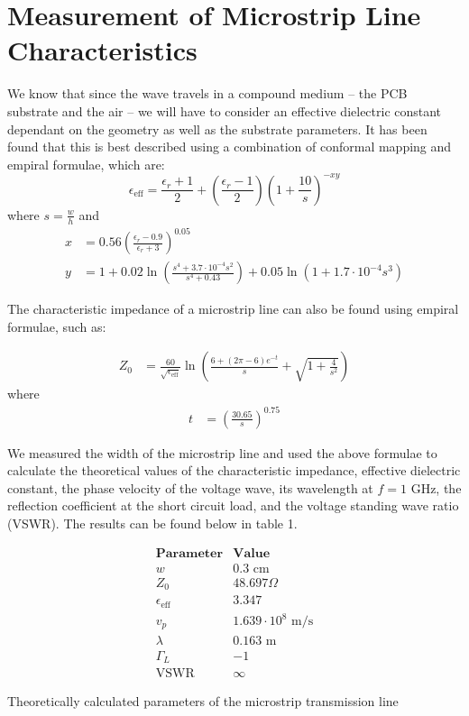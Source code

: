 \documentclass[10pt]{article}
\begin{document}
\section{Measurement of Microstrip Line Characteristics}

We know that since the wave travels in a compound medium -- the PCB substrate and the air -- we will have 
to consider an effective dielectric constant dependant on the geometry as well as the substrate parameters. It has been
found that this is best described using a combination of conformal mapping and empiral formulae, which are:
\[
    \epsilon_{\text{eff}} = \frac{\epsilon_r+1}{2}+\left(\frac{\epsilon_r-1}{2}\right)\left(1+\frac{10}{s}\right)^{-xy}
\]
where $s = \frac{w}{h}$ and
\begin{align*}
    x &= 0.56\left(\frac{\epsilon_r-0.9}{\epsilon_r+3}\right)^{0.05}\\
    y &= 1 + 0.02\ln{\left(\frac{s^4+3.7\cdot10^{-4}s^2}{s^4 + 0.43}\right)} + 0.05\ln{\left(1 + 1.7\cdot10^{-4}s^3\right)}
\end{align*}

The characteristic impedance of a microstrip line can also be found using empiral formulae, such as:

\begin{align*}
    Z_0 &= \frac{60}{\sqrt{\epsilon_{\text{eff}}}}\ln{\left(\frac{6 + (2\pi - 6)e^{-t}}{s} + \sqrt{1 + \frac{4}{s^2}}\right)}
\end{align*}
where
\begin{align*}
  t &= \left(\frac{30.65}{s}\right)^{0.75}
\end{align*}

We measured the width of the microstrip line and used the above formulae to calculate the theoretical values of the
characteristic impedance, effective dielectric constant, the phase velocity of the voltage wave, its wavelength at $f = 1 \text{ GHz}$, 
the reflection coefficient at the short circuit load, and the voltage standing wave ratio (VSWR). The results can be found below in table 1.

\begin{table}[h]
  \[
      \begin{array}{c|c}
          \textbf{Parameter} & \textbf{Value} \\ \hline
          w & 0.3 \text{ cm}\\
          Z_0 & 48.697\Omega\\
          \epsilon_\text{eff} & 3.347\\
          v_p & 1.639\cdot10^8\text{ m}/\text{s}\\
          \lambda & 0.163 \text{ m}\\
          \Gamma_L & -1\\
          \text{VSWR} & \infty
      \end{array}
  \]
  \caption{Theoretically calculated parameters of the microstrip transmission line\vspace{-0.2cm}}
\end{table}
\end{document}
